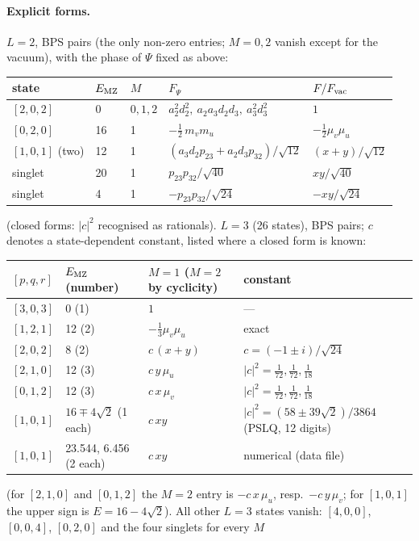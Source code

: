 \paragraph{Explicit forms.} $L=2$, BPS pairs (the only non-zero entries; $M=0,2$ vanish except for the vacuum), with the phase of $\Psi$ fixed as above:
\begin{center}
\begin{tabular}{lllll}
\toprule
state & $E_{\rm MZ}$ & $M$ & $F_\Psi$ & $F/F_{\rm vac}$\\
\midrule
$[2,0,2]$ & 0 & $0,1,2$ & $a_2^2d_2^2,\ a_2a_3d_2d_3,\ a_3^2d_3^2$ & $1$\\
$[0,2,0]$ & 16 & 1 & $-\tfrac12\,m_vm_u$ & $-\tfrac12\mu_v\mu_u$\\
$[1,0,1]$ (two) & 12 & 1 & $(a_3d_2p_{23}+a_2d_3p_{32})/\sqrt{12}$ & $(x+y)/\sqrt{12}$\\
singlet & 20 & 1 & $p_{23}p_{32}/\sqrt{40}$ & $xy/\sqrt{40}$\\
singlet & 4 & 1 & $-p_{23}p_{32}/\sqrt{24}$ & $-xy/\sqrt{24}$\\
\bottomrule
\end{tabular}
\end{center}
(closed forms: $|c|^2$ recognised as rationals). $L=3$ (26 states), BPS pairs; $c$ denotes a state-dependent constant, listed where a closed form is known:
\begin{center}\small
\begin{tabular}{@{}lp{2.9cm}p{3.1cm}p{5.6cm}@{}}
\toprule
$[p,q,r]$ & $E_{\rm MZ}$ (number) & $M=1$ ($M=2$ by cyclicity) & constant\\
\midrule
$[3,0,3]$ & 0 (1) & $1$ & ---\\
$[1,2,1]$ & 12 (2) & $-\tfrac13\mu_v\mu_u$ & exact\\
$[2,0,2]$ & 8 (2) & $c\,(x+y)$ & $c=(-1\pm i)/\sqrt{24}$\\
$[2,1,0]$ & 12 (3) & $c\,y\,\mu_u$ & $|c|^2=\tfrac1{72},\tfrac1{72},\tfrac1{18}$\\
$[0,1,2]$ & 12 (3) & $c\,x\,\mu_v$ & $|c|^2=\tfrac1{72},\tfrac1{72},\tfrac1{18}$\\
$[1,0,1]$ & $16\mp4\sqrt2$ (1 each) & $c\,xy$ & $|c|^2=(58\pm39\sqrt2)/3864$ (PSLQ, 12 digits)\\
$[1,0,1]$ & 23.544, 6.456 (2 each) & $c\,xy$ & numerical (data file)\\
\bottomrule
\end{tabular}
\end{center}
(for $[2,1,0]$ and $[0,1,2]$ the $M=2$ entry is $-c\,x\,\mu_u$, resp.\ $-c\,y\,\mu_v$; for $[1,0,1]$ the upper sign is $E=16-4\sqrt2$). All other $L=3$ states vanish: $[4,0,0]$, $[0,0,4]$, $[0,2,0]$ and the four singlets for every $M$
